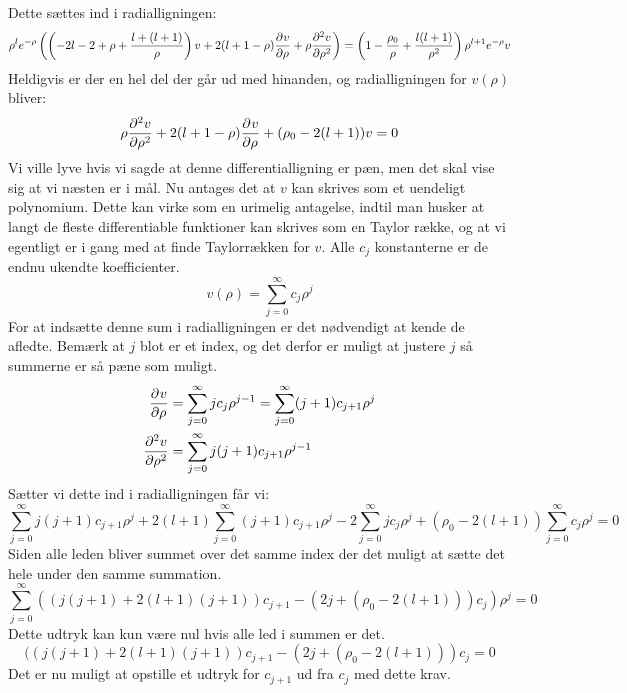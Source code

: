 \documentclass[../../Atom-ogMolekylefysik.tex]{subfiles}
\begin{document}
Dette sættes ind i radialligningen:
\begin{equation}
\rho^le^{-\rho}\left(\left(-2l-2+\rho+\frac{l+(l+1)}{\rho}\right)v+2(l+1-\rho)\pdif{\rho}{v}+\rho\pdif[2]{\rho}{v}\right)=\left(1-\frac{\rho_0}{\rho}+\frac{l(l+1)}{\rho^2}\right)\rho^{l+1}e^{-\rho}v
\end{equation}
Heldigvis er der en hel del der går ud med hinanden, og radialligningen for $v(\rho)$ bliver:
\begin{equation}
    \rho\pdif[2]{\rho}{v}+2(l+1-\rho)\pdif{\rho}{v}+(\rho_0-2(l+1))v=0
\end{equation}
Vi ville lyve hvis vi sagde at denne differentialligning er pæn, men det skal vise sig at vi næsten er i mål. Nu antages det at $v$ kan skrives som et uendeligt polynomium. Dette kan virke som en urimelig antagelse, indtil man husker at langt de fleste differentiable funktioner kan skrives som en Taylor række, og at vi egentligt er i gang med at finde Taylorrækken for $v$. Alle $c_j$ konstanterne er de endnu ukendte koefficienter.
\begin{equation}
    v(\rho) = \sum_{j=0}^\infty c_j\rho^j
\end{equation}
For at indsætte denne sum i radialligningen er det nødvendigt at kende de afledte. Bemærk at $j$ blot er et index, og det derfor er muligt at justere $j$ så summerne er så pæne som muligt.
\begin{align}
    \pdif{\rho}{v}&= \sum_{j=0}^\infty jc_j\rho^{j-1}=\sum_{j=0}^\infty(j+1)c_{j+1}\rho^{j}\\
    \pdif[2]{\rho}{v} &= \sum_{j=0}^\infty j(j+1)c_{j+1}\rho^{j-1}
\end{align}
Sætter vi dette ind i radialligningen får vi:
\begin{equation}
    \sum_{j=0}^\infty j(j+1)c_{j+1}\rho^j+2(l+1)\sum_{j=0}^\infty(j+1)c_{j+1}\rho^j-2\sum_{j=0}^\infty jc_j\rho^j+(\rho_0-2(l+1))\sum_{j=0}^\infty c_j\rho^j=0
\end{equation}
Siden alle leden bliver summet over det samme index der det muligt at sætte det hele under den samme summation.
\begin{equation}
    \sum_{j=0}^\infty \left((j(j+1)+2(l+1)(j+1))c_{j+1}-(2 j+(\rho_0-2(l+1))) c_j\right)\rho^j=0
\end{equation}
Dette udtryk kan kun være nul hvis alle led i summen er det.
\begin{equation}
    ((j(j+1)+2(l+1)(j+1))c_{j+1}-(2 j+(\rho_0-2(l+1))) c_j=0
\end{equation}
Det er nu muligt at opstille et udtryk for $c_{j+1}$ ud fra $c_j$ med dette krav.
\end{document}
